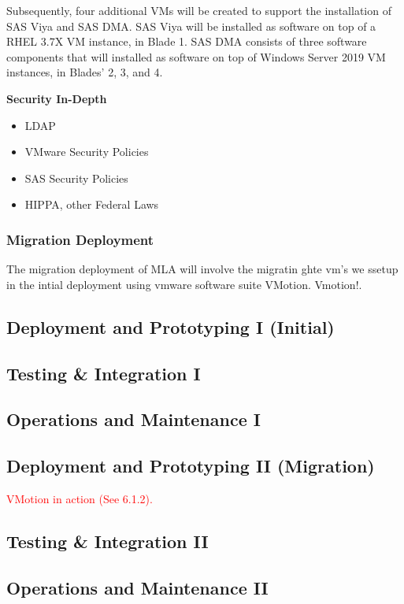 Subsequently, four additional VMs will be created to support the installation of SAS Viya and SAS DMA. SAS Viya will be installed as software on top of a RHEL 3.7X VM instance, in Blade 1. SAS DMA consists of three software components that will installed as software on top of Windows Server 2019 VM instances, in Blades' 2, 3, and 4. 

\textbf{Security In-Depth}
\begin{itemize}
    \item LDAP
    \item VMware Security Policies
    \item SAS Security Policies
    \item HIPPA, other Federal Laws
\end{itemize}

\subsubsection{Migration Deployment}
The migration deployment of MLA will involve the migratin ghte vm's we ssetup in the intial deployment using vmware software suite VMotion. Vmotion!.

\subsection{Deployment and Prototyping I (Initial)}

\subsection{Testing \& Integration I}

\subsection{Operations and Maintenance I}

\subsection{Deployment and Prototyping II (Migration)}
\textcolor{red}{VMotion in action (See 6.1.2).}

\subsection{Testing \& Integration II}

\subsection{Operations and Maintenance II}

